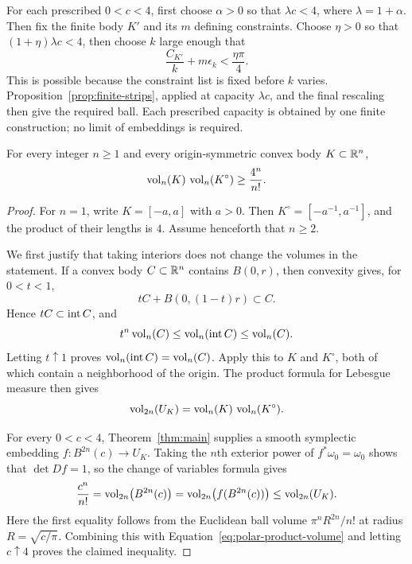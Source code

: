 \begin{remark}
\label{rem:parameter-order}
For each prescribed $0<c<4$, first choose $\alpha>0$ so that
$\lambda c<4$, where $\lambda=1+\alpha$. Then fix the finite body
$K'$ and its $m$ defining constraints. Choose $\eta>0$ so that
$(1+\eta)\lambda c<4$, then choose $k$ large enough that
\[
 \frac{C_{K'}}k+m\epsilon_k<\frac{\eta\pi}{4}.
\]
This is possible because the constraint list is fixed before $k$
varies. Proposition~\ref{prop:finite-strips}, applied at capacity
$\lambda c$, and the final rescaling then give the required ball.
Each prescribed capacity is obtained by one finite construction; no
limit of embeddings is required.
\end{remark}

\begin{corollary}
\label{cor:mahler}
For every integer $n\ge1$ and every origin-symmetric convex body
$K\subset\mathbb R^n$,
\[
 \operatorname{vol}_n(K)\,\operatorname{vol}_n(K^\circ)\ge\frac{4^n}{n!}.
\]
\end{corollary}

\begin{proof}
For $n=1$, write $K=[-a,a]$ with $a>0$. Then
$K^\circ=[-a^{-1},a^{-1}]$, and the product of their lengths is $4$.
Assume henceforth that $n\ge2$.

We first justify that taking interiors does not change the volumes in
the statement. If a convex body $C\subset\mathbb R^n$ contains $B(0,r)$,
then convexity gives, for $0<t<1$,
\[
 tC+B(0,(1-t)r)\subset C.
\]
Hence $tC\subset\operatorname{int} C$, and
\[
 t^n\operatorname{vol}_n(C)\le\operatorname{vol}_n(\operatorname{int} C)\le\operatorname{vol}_n(C).
\]
Letting $t\uparrow1$ proves
$\operatorname{vol}_n(\operatorname{int} C)=\operatorname{vol}_n(C)$. Apply this to $K$ and $K^\circ$,
both of which contain a neighborhood of the origin. The product formula
for Lebesgue measure then gives
\begin{equation}\label{eq:polar-product-volume}
 \operatorname{vol}_{2n}(U_K)=\operatorname{vol}_n(K)\,\operatorname{vol}_n(K^\circ).
\end{equation}

For every $0<c<4$, Theorem~\ref{thm:main} supplies a smooth symplectic
embedding $f:B^{2n}(c)\to U_K$. Taking the $n$th exterior power of
$f^*\omega_0=\omega_0$ shows that $\det Df=1$, so the change of
variables formula gives
\[
 \frac{c^n}{n!}
 =\operatorname{vol}_{2n}\bigl(B^{2n}(c)\bigr)
 =\operatorname{vol}_{2n}\bigl(f(B^{2n}(c))\bigr)
 \le\operatorname{vol}_{2n}(U_K).
\]
Here the first equality follows from the Euclidean ball volume
$\pi^nR^{2n}/n!$ at radius $R=\sqrt{c/\pi}$. Combining this with
Equation~\eqref{eq:polar-product-volume} and letting $c\uparrow4$ proves
the claimed inequality.
\end{proof}

